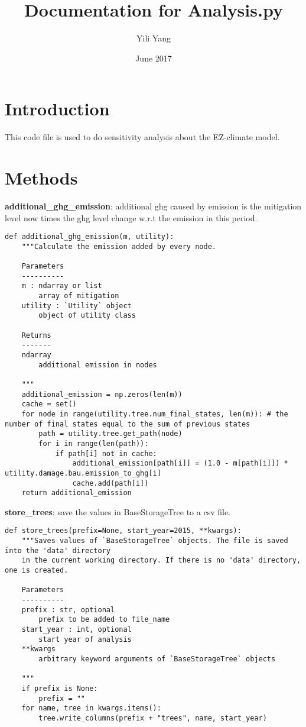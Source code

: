\documentclass[12pt]{article}
\title{Documentation for Analysis.py}
\author{Yili Yang}
\date{June 2017}
\begin{document}
\maketitle

\section{Introduction}
This code file is used to do sensitivity analysis about the EZ-climate model.
\section{Methods}
\textbf{additional\_ghg\_emission}: additional ghg caused by emission is the mitigation level now times the ghg level change w.r.t the emission in this period.
\begin{verbatim}
def additional_ghg_emission(m, utility):
	"""Calculate the emission added by every node.

	Parameters
	----------
	m : ndarray or list
		array of mitigation
	utility : `Utility` object
		object of utility class
	
	Returns
	-------
	ndarray
		additional emission in nodes
	
	"""
	additional_emission = np.zeros(len(m))
	cache = set()
	for node in range(utility.tree.num_final_states, len(m)): # the number of final states equal to the sum of previous states
		path = utility.tree.get_path(node)
		for i in range(len(path)):
			if path[i] not in cache:
				additional_emission[path[i]] = (1.0 - m[path[i]]) *  utility.damage.bau.emission_to_ghg[i]
				cache.add(path[i])
	return additional_emission
\end{verbatim}

\textbf{store\_trees}: save the values in BaseStorageTree to a csv file.
\begin{verbatim}
def store_trees(prefix=None, start_year=2015, **kwargs):
	"""Saves values of `BaseStorageTree` objects. The file is saved into the 'data' directory
	in the current working directory. If there is no 'data' directory, one is created.

	Parameters
	----------
	prefix : str, optional
		prefix to be added to file_name
	start_year : int, optional
		start year of analysis
	**kwargs
		arbitrary keyword arguments of `BaseStorageTree` objects

	"""
	if prefix is None:
		prefix = ""
	for name, tree in kwargs.items():
		tree.write_columns(prefix + "trees", name, start_year)
\end{verbatim}
\end{document}
